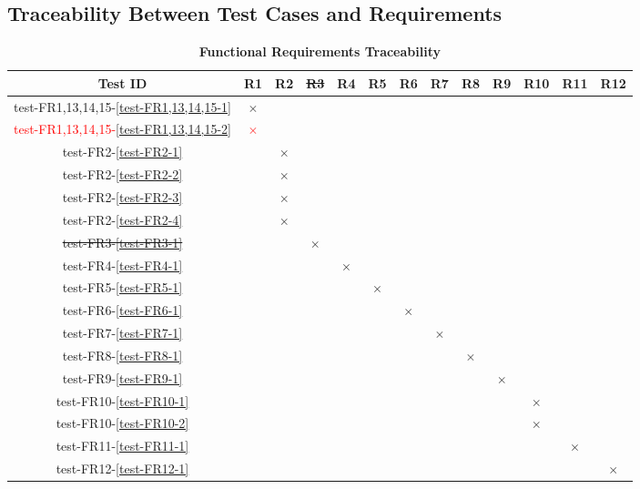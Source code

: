 \documentclass[12pt, titlepage]{article}
\begin{document}
\subsection{Traceability Between Test Cases and Requirements}
\label{section:5.3}
\begin{table}[H]
\centering
\begin{tabular}{|c|c|c|c|c|c|c|c|c|c|c|c|c|}
\hline
 Test ID & R1 & R2 & \color{red}\sout{R3} & R4 & R5 & R6 & R7 & R8 & R9 & R10 & R11 & R12 \\
\hline
test-FR1,13,14,15-\ref{test-FR1,13,14,15-1} & $\times$ & & & & & & & & & & & \\
\hline
\textcolor{red}{test-FR1,13,14,15-\ref{test-FR1,13,14,15-2}} & \textcolor{red}{$\times$} & & & & & & & & & & & \\
\hline
test-FR2-\ref{test-FR2-1} & & $\times$  &  & & & & & & & & & \\
\hline
test-FR2-\ref{test-FR2-2} & & $\times$ & & &  & & & & & & & \\
\hline
test-FR2-\ref{test-FR2-3} & & $\times$ & & & & & & & & & & \\
\hline
test-FR2-\ref{test-FR2-4} & & $\times$ & & & & & & & & & &  \\
\hline
\color{red}\sout{test-FR3-\ref{test-FR3-1}} & & & \color{red}\sout{$\times$} & & & & & & & & &\\
\hline
test-FR4-\ref{test-FR4-1} & & & & $\times$ & & & & & & & & \\
\hline
test-FR5-\ref{test-FR5-1} & & & & & $\times$ & & & & & & & \\
\hline
test-FR6-\ref{test-FR6-1} & & & & & & $\times$ & & & & & &\\
\hline
test-FR7-\ref{test-FR7-1} & & & & & & & $\times$ & & & & & \\
\hline
test-FR8-\ref{test-FR8-1} & & & & & & & & $\times$ & & & &\\
\hline
test-FR9-\ref{test-FR9-1} & & & & & & & & & $\times$ & & & \\
\hline
test-FR10-\ref{test-FR10-1} & & & & & & & & & & $\times$ & & \\
\hline
test-FR10-\ref{test-FR10-2} & & & & & & & & & & $\times$ & &\\
\hline
test-FR11-\ref{test-FR11-1} & & & & & & & & & & & $\times$ &\\
\hline
test-FR12-\ref{test-FR12-1} & & & & & & & & & & & & $\times$\\
\hline
\end{tabular}
\caption{\bf Functional Requirements Traceability}
\end{table}
\end{document}

